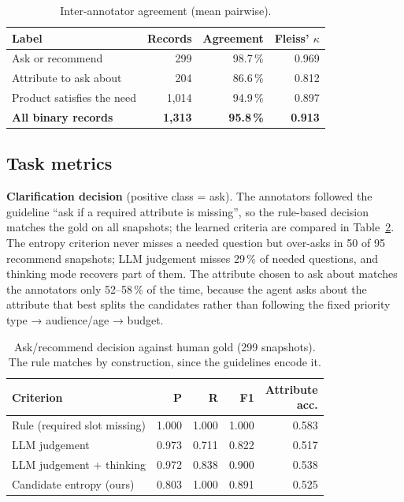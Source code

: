 \documentclass[10pt,a4paper,twocolumn]{article}
\begin{document}
\begin{table}[!htb]
\centering\small
\caption{Inter-annotator agreement (mean pairwise).}
\label{tab:iaa}
\begin{tabularx}{\columnwidth}{@{}X rrr@{}}
\toprule
Label & Records & Agreement & Fleiss' $\kappa$\\
\midrule
Ask or recommend & 299 & 98.7\,\% & 0.969\\
Attribute to ask about & 204 & 86.6\,\% & 0.812\\
Product satisfies the need & 1,014 & 94.9\,\% & 0.897\\
\textbf{All binary records} & \textbf{1,313} & \textbf{95.8\,\%} & \textbf{0.913}\\
\bottomrule
\end{tabularx}
\end{table}

\subsection{Task metrics}
\textbf{Clarification decision} (positive class = ask). The annotators followed the guideline ``ask if a required attribute is missing'', so the rule-based decision matches the gold on all snapshots; the learned criteria are compared in Table~\ref{tab:decision}. The entropy criterion never misses a needed question but over-asks in 50 of 95 recommend snapshots; LLM judgement misses 29\,\% of needed questions, and thinking mode recovers part of them. The attribute chosen to ask about matches the annotators only 52–58\,\% of the time, because the agent asks about the attribute that best splits the candidates rather than following the fixed priority type → audience/age → budget.

\begin{table}[!htb]
\centering\small
\caption{Ask/recommend decision against human gold (299 snapshots). The rule matches by construction, since the guidelines encode it.}
\label{tab:decision}
\begin{tabularx}{\columnwidth}{@{}X rrrr@{}}
\toprule
Criterion & P & R & F1 & \makecell[r]{Attribute\\acc.}\\
\midrule
Rule (required slot missing) & 1.000 & 1.000 & 1.000 & 0.583\\
LLM judgement & 0.973 & 0.711 & 0.822 & 0.517\\
LLM judgement + thinking & 0.972 & 0.838 & 0.900 & 0.538\\
Candidate entropy (ours) & 0.803 & 1.000 & 0.891 & 0.525\\
\bottomrule
\end{tabularx}
\end{table}
\end{document}
